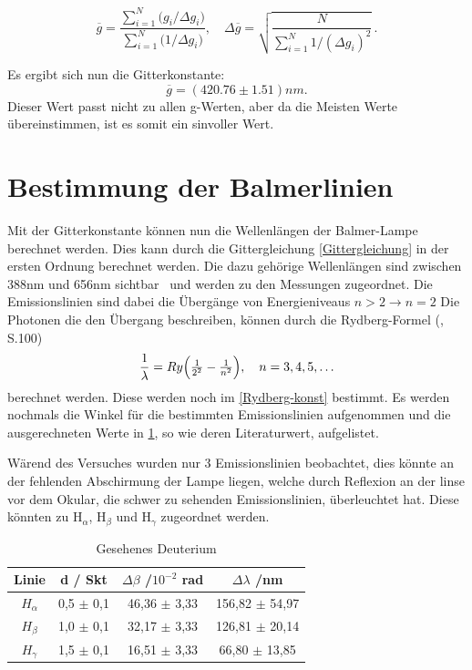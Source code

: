 \begin{equation}
  \overline{g}
  = \frac{\sum_{i=1}^{N} \bigl(g_i/\Delta g_i\bigr)}
         {\sum_{i=1}^{N} \bigl(1/\Delta g_i\bigr)},
  \quad
  \Delta\overline{g}
  = \sqrt{\frac{N}{\sum_{i=1}^{N} 1/(\Delta g_i)^{2}}}\,.
\end{equation}

Es ergibt sich nun die Gitterkonstante:
\begin{equation}
    \overline{g} = (420.76 \pm 1.51) nm.
    \label{gitterkon}
\end{equation}
Dieser Wert passt nicht zu allen g-Werten, aber da die Meisten Werte übereinstimmen, ist es somit ein sinvoller Wert. 

\section{Bestimmung der Balmerlinien} \label{Bestimmung der Balmer}

Mit der Gitterkonstante können nun die Wellenlängen der Balmer-Lampe berechnet werden. 
Dies kann durch die Gittergleichung \ref{Gittergleichung} in der ersten Ordnung berechnet werden.
Die dazu gehörige Wellenlängen sind zwischen 388nm und 656nm sichtbar~\cite{Ulm} und werden zu den Messungen zugeordnet.
Die Emissionslinien sind dabei die Übergänge von Energieniveaus $n > 2 \xrightarrow{} n = 2$ 
Die Photonen die den Übergang beschreiben, können durch die Rydberg-Formel (\cite{Demtröder_Ex3}, S.100) 
\begin{equation}
  \frac{1}{\lambda}
  = Ry\Bigl(\tfrac{1}{2^{2}} - \tfrac{1}{n^{2}}\Bigr),
  \quad n=3,4,5,\dots
  \label{Rydberg-Formel}
\end{equation}
berechnet werden.
Diese werden noch im \cref{Rydberg-konst} bestimmt. 
Es werden nochmals die Winkel für die bestimmten Emissionslinien aufgenommen und die ausgerechneten Werte in \cref{tab: gesehenes deut}, so wie deren Literaturwert, aufgelistet. 

Wärend des Versuches wurden nur 3 Emissionslinien beobachtet, dies könnte an der fehlenden Abschirmung der Lampe liegen, welche durch Reflexion an der linse vor dem Okular, die schwer zu sehenden Emissionslinien, überleuchtet hat. %
Diese könnten zu H$_\alpha$, H$_\beta$ und H$_\gamma$ zugeordnet werden.

\begin{table}[htbp]
    \centering
    \begin{tabular}{|c|c|c|c|}
        Linie & d / Skt & $\Delta \beta$ /$10^{-2}$ rad & $\Delta \lambda$ /nm \\
        \hline
        $H_\alpha$ & 0,5 $\pm$ 0,1 & 46,36 $\pm$ 3,33 & 156,82 $\pm$ 54,97 \\
        $H_\beta$ & 1,0 $\pm$ 0,1 & 32,17 $\pm$ 3,33 & 126,81 $\pm$ 20,14 \\
        $H_\gamma$ & 1,5 $\pm$ 0,1 & 16,51 $\pm$ 3,33 & 66,80 $\pm$ 13,85 \\


    \end{tabular}
    \caption{Gesehenes Deuterium}
    \label{tab: gesehenes deut}
\end{table}

